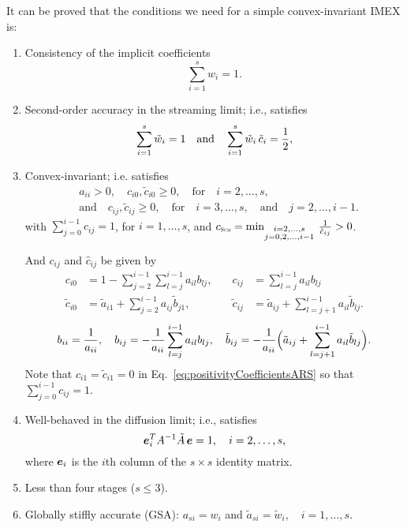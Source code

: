 It can be proved \cite{chu_etal_2018} that the conditions we need for a simple convex-invariant IMEX is:
\begin{enumerate}
    \item Consistency of the implicit coefficients
    \begin{equation}
      \sum_{i=1}^{s}w_{i}=1.
    \end{equation}
    \item Second-order accuracy in the streaming limit; i.e., satisfies \begin{equation}
      \sum_{i=1}^{s}\tilde{w}_{i}=1
      \quad\text{and}\quad
      \sum_{i=1}^{s}\tilde{w}_{i}\,\tilde{c}_{i}=\frac{1}{2},
      \label{eq:orderConditionsEx}
    \end{equation}
    \item Convex-invariant; i.e. satisfies 
    \begin{align}
      &a_{ii}>0, \quad c_{i0},\tilde{c}_{i0}\ge0, \quad \text{for} \quad i=2,\ldots,s, \nonumber \\
      &\text{and} \quad c_{ij},\tilde{c}_{ij}\ge0, \quad \text{for} \quad i=3,\ldots,s, \quad\text{and}\quad j=2,\ldots,i-1.  
    \end{align}
    with $\sum_{j=0}^{i-1}c_{ij}=1$, for $i=1,\ldots,s$, and $c_{\textnormal{\tiny\textsc{Sch}}}=\min_{\substack{i = 2,\ldots,s \\ 
                  j = 0,2,\ldots,i-1}}\,\frac{1}{\hat{c}_{ij}}>0$.
                  
    And $c_{ij}$ and $\hat{c}_{ij}$ be given by
\begin{equation}
  \begin{aligned}
    c_{i0} &= 1-\sum_{j=2}^{i-1}\sum_{l=j}^{i-1}a_{il}b_{lj}, \quad &
    c_{ij} &= \sum_{l=j}^{i-1}a_{il}b_{lj} \\
    \tilde{c}_{i0} &= \tilde{a}_{i1}+\sum_{j=2}^{i-1}a_{ij}\tilde{b}_{j1}, \quad &
    \tilde{c}_{ij} &= \tilde{a}_{ij}+\sum_{l=j+1}^{i-1}a_{il}\tilde{b}_{lj}.  
  \end{aligned}
  \label{eq:positivityCoefficientsARS}
\end{equation}
\begin{equation}
  b_{ii} = \frac{1}{a_{ii}}, \quad
  b_{ij} = -\frac{1}{a_{ii}}\sum_{l=j}^{i-1}a_{il}b_{lj}, \quad
  \tilde{b}_{ij} = -\frac{1}{a_{ii}}\Big(\tilde{a}_{ij}+\sum_{l=j+1}^{i-1}a_{il}\tilde{b}_{lj}\Big).  
\end{equation}
Note that $c_{i1}=\tilde{c}_{i1}=0$ in Eq.~\eqref{eq:positivityCoefficientsARS} so that $\sum_{j=0}^{i-1}c_{ij}=1$.

    \item Well-behaved in the diffusion limit; i.e., satisfies \begin{equation}
      \boldsymbol{e}_{i}^{T}A^{-1}\tilde{A}\,\boldsymbol{e} = 1, \quad i=2,\ldots,s,
      \label{eq:diffusionCondition}
    \end{equation}
    where $\boldsymbol{e}_{i}$ is the $i$th column of the $s\times s$ identity matrix.
    \item Less than four stages ($s\le3$).
    \item Globally stiffly accurate (GSA): $a_{si}=w_{i}$ and $\tilde{a}_{si}=\tilde{w}_{i},\quad i=1,\ldots,s$.
\end{enumerate}  
